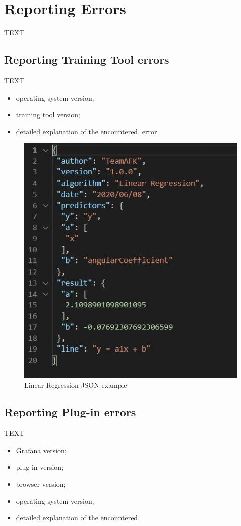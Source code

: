 \section{Reporting Errors}
TEXT


\subsection{Reporting Training Tool errors}
TEXT
\begin{itemize}
	\item operating system version;
	\item training tool version;
	\item detailed explanation of the encountered. error
\end{itemize}

\begin{figure}[H]
\centering
\includegraphics[scale=0.50]{img/json/jsonRL.jpg}
\caption{Linear Regression JSON example}
\end{figure}

\subsection{Reporting Plug-in errors}
TEXT
\begin{itemize}
\item Grafana version;
\item plug-in version;
\item browser version;
\item operating system version;
\item  detailed explanation of the encountered.
\end{itemize}

